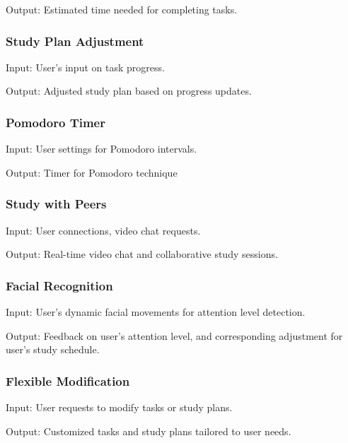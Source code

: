 \documentclass{article}
\begin{document}
\noindent Output: Estimated time needed for completing tasks.

\subsubsection{Study Plan Adjustment}
\vspace{1ex}

\noindent Input: User's input on task progress.

\noindent Output: Adjusted study plan based on progress updates.

\subsubsection{Pomodoro Timer}
\vspace{1ex}

\noindent Input: User settings for Pomodoro intervals.

\noindent Output: Timer for Pomodoro technique


\subsubsection{Study with Peers}
\vspace{1ex}

\noindent Input: User connections, video chat requests.

\noindent Output: Real-time video chat and collaborative study sessions.
     

\subsubsection{Facial Recognition}
\vspace{1ex}

\noindent Input: User's dynamic facial movements for attention level detection.

\noindent Output: Feedback on user's attention level, and corresponding adjustment for user's study schedule.

\subsubsection{Flexible Modification}
\vspace{1ex}

\noindent Input: User requests to modify tasks or study plans.

\noindent Output: Customized tasks and study plans tailored to user needs.
\end{document}
